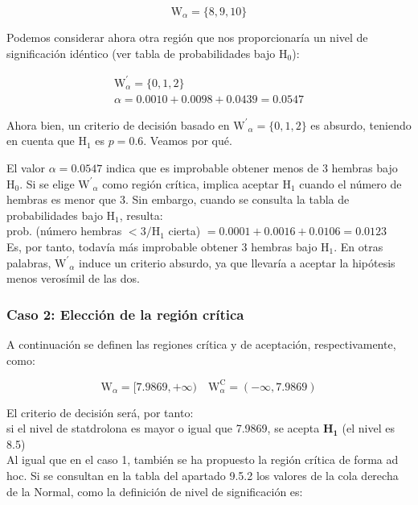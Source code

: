 \documentclass[
]{article}
\begin{document}
\[
\mathrm{W}_{\alpha}=\{8,9,10\}
\]

Podemos considerar ahora otra región que nos proporcionaría un nivel de significación idéntico (ver tabla de probabilidades bajo \(\mathrm{H}_{0}\)):

\[
\begin{gathered}
\mathrm{W}_{\alpha}^{\prime}=\{0,1,2\} \\
\alpha=0.0010+0.0098+0.0439=0.0547
\end{gathered}
\]

Ahora bien, un criterio de decisión basado en \(\mathrm{W}^{\prime}{ }_{\alpha}=\{0,1,2\}\) es absurdo, teniendo en cuenta que \(\mathrm{H}_{1}\) es \(p=0.6\). Veamos por qué.

El valor \(\alpha=0.0547\) indica que es improbable obtener menos de 3 hembras bajo \(\mathrm{H}_{0}\). Si se elige \(\mathrm{W}^{\prime}{ }_{\alpha}\) como región crítica, implica aceptar \(\mathrm{H}_{1}\) cuando el número de hembras es menor que 3. Sin embargo, cuando se consulta la tabla de probabilidades bajo \(\mathrm{H}_{1}\), resulta:\\
prob. (número hembras \(<3 / \mathrm{H}_{1}\) cierta) \(=0.0001+0.0016+0.0106=0.0123\)\\
Es, por tanto, todavía más improbable obtener 3 hembras bajo \(\mathrm{H}_{1}\). En otras palabras, \(\mathrm{W}^{\prime}{ }_{\alpha}\) induce un criterio absurdo, ya que llevaría a aceptar la hipótesis menos verosímil de las dos.

\subsubsection{Caso 2: Elección de la región crítica}\label{caso-2-elecciuxf3n-de-la-regiuxf3n-cruxedtica}

A continuación se definen las regiones crítica y de aceptación, respectivamente, como:

\[
\mathrm{W}_{\alpha}=[7.9869,+\infty) \quad \mathrm{W}_{\alpha}^{\mathrm{C}}=(-\infty, 7.9869)
\]

El criterio de decisión será, por tanto:\\
si el nivel de statdrolona es mayor o igual que 7.9869, se acepta \(\mathbf{H}_{\mathbf{1}}\) (el nivel es 8.5)\\
Al igual que en el caso 1, también se ha propuesto la región crítica de forma ad hoc. Si se consultan en la tabla del apartado 9.5.2 los valores de la cola derecha de la Normal, como la definición de nivel de significación es:
\end{document}

